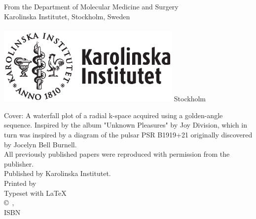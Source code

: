 \frontmatter %

\vfill
\begin{center}
{From the Department of Molecular Medicine and Surgery\\
Karolinska Institutet, Stockholm, Sweden}
\\[2mm]
\vfill
{\Huge \myMainTitle}
\\[10mm]
{\large \myName}
\vfill
\includegraphics[width=90mm]{img/KI-Logo_pos.eps}
\vfill
Stockholm~\myCopyrightYear\\
\end{center}
\vfill

\clearpage
\thispagestyle{empty} %
\vspace*{\fill}
{\ssmall Cover: A waterfall plot of a radial k-space acquired using a golden-angle sequence. Inspired by the album "Unknown Pleasures" by Joy Division, which in turn was inspired by a diagram of the pulsar PSR B1919+21 originally discovered by Jocelyn Bell Burnell.}\\[10mm]
{\ssmall All previously published papers were reproduced with permission from the publisher.\\
Published by Karolinska Institutet.\\
Printed by \thePrinter~\myCopyrightYear\\
Typeset with \LaTeX\\
\copyright~\myName,~\myCopyrightYear\\
ISBN \myISBNprint}

